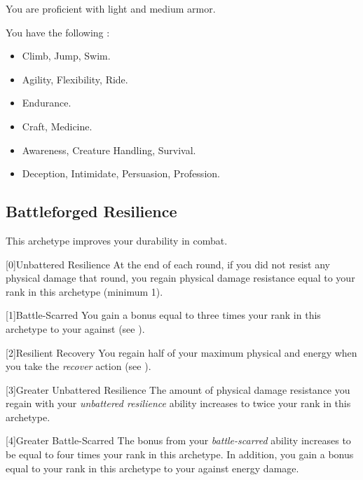         You are proficient with light and medium armor.

        You have the following :
        \begin{itemize}
            \item {} Climb, Jump, Swim.
            \item {} Agility, Flexibility, Ride.
            \item {} Endurance.
            \item {} Craft, Medicine.
            \item {} Awareness, Creature Handling, Survival.
            \item {} Deception, Intimidate, Persuasion, Profession.
        \end{itemize}

    \newpage
    \subsection{Battleforged Resilience}
        This archetype improves your durability in combat.

        [0]{Unbattered Resilience} At the end of each round, if you did not resist any physical damage that round, you regain physical damage resistance equal to your rank in this archetype (minimum 1).

        [1]{Battle-Scarred} You gain a bonus equal to three times your rank in this archetype to your  against  (see ).

        [2]{Resilient Recovery} You regain half of your maximum physical and energy  when you take the \textit{recover} action (see ).

        [3]{Greater Unbattered Resilience} The amount of physical damage resistance you regain with your \textit{unbattered resilience} ability increases to twice your rank in this archetype.

        [4]{Greater Battle-Scarred} The bonus from your \textit{battle-scarred} ability increases to be equal to four times your rank in this archetype.
        In addition, you gain a bonus equal to your rank in this archetype to your  against energy damage.

